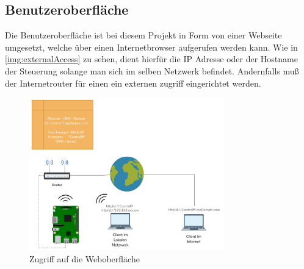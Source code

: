 \subsection{Benutzeroberfläche}
Die Benutzeroberfläche ist bei diesem Projekt in Form von einer Webseite umgesetzt, welche über einen Internetbrowser aufgerufen werden kann.  Wie in \autoref{img:externalAccess} zu sehen, dient hierfür die IP Adresse oder der Hostname der Steuerung solange man sich im selben Netzwerk befindet. Andernfalls muß der Internetrouter für einen ein externen zugriff eingerichtet werden. 
 \begin{figure}[H]
	\begin{center}
		\includegraphics[width=0.75\textwidth ,clip]{./images/IFTTT.pdf}
		\caption{Zugriff auf die Weboberfläche}
		\label{img:externalAccess}
	\end{center} 
\end{figure}

